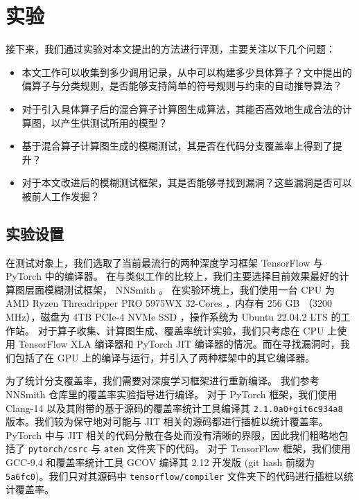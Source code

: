 
\chapter{实验}

接下来，我们通过实验对本文提出的方法进行评测，主要关注以下几个问题：

\begin{itemize}
    \item 本文工作可以收集到多少调用记录，从中可以构建多少具体算子？文中提出的偏算子与分类规则，是否能够支持简单的符号规则与约束的自动推导算法？
    \item 对于引入具体算子后的混合算子计算图生成算法，其能否高效地生成合法的计算图，以产生供测试所用的模型？
    \item 基于混合算子计算图生成的模糊测试，其是否在代码分支覆盖率上得到了提升？
    \item 对于本文改进后的模糊测试框架，其是否能够寻找到漏洞？这些漏洞是否可以被前人工作发掘？
\end{itemize}

\section{实验设置}

在测试对象上，我们选取了当前最流行的两种深度学习框架 TensorFlow 与 PyTorch 中的编译器。
在与类似工作的比较上，我们主要选择目前效果最好的计算图层面模糊测试框架， NNSmith 。
在实验环境上，我们使用一台 CPU 为 AMD Ryzen Threadripper PRO 5975WX 32-Cores ，内存有 256 GB （3200 MHz），磁盘为 4TB PCIe-4 NVMe SSD ，操作系统为 Ubuntu 22.04.2 LTS 的工作站。
对于算子收集、计算图生成、覆盖率统计实验，我们只考虑在 CPU 上使用 TensorFlow XLA 编译器和 PyTorch JIT 编译器的情况。而在寻找漏洞时，我们包括了在 GPU 上的编译与运行，并引入了两种框架中的其它编译器。

为了统计分支覆盖率，我们需要对深度学习框架进行重新编译。
我们参考 NNSmith 仓库里的覆盖率实验指导\cite{nnsmith_expinstr}进行编译。
对于 PyTorch 框架，我们使用 Clang-14 以及其附带的基于源码的覆盖率统计工具\cite{clang14_cov}编译其 \texttt{2.1.0a0+git6c934a8} 版本。我们较为保守地对可能与 JIT 相关的源码都进行插桩以统计覆盖率。 PyTorch 中与 JIT 相关的代码分散在各处而没有清晰的界限，因此我们粗略地包括了 \texttt{pytorch/csrc} 与 \texttt{aten} 文件夹下的代码。
对于 TensorFlow 框架，我们使用 GCC-9.4 和覆盖率统计工具 GCOV\cite{gcov} 编译其 2.12 开发版 (git hash 前缀为 \texttt{5a6fc0})。我们只对其源码中 \texttt{tensorflow/compiler} 文件夹下的代码进行插桩以统计覆盖率。

